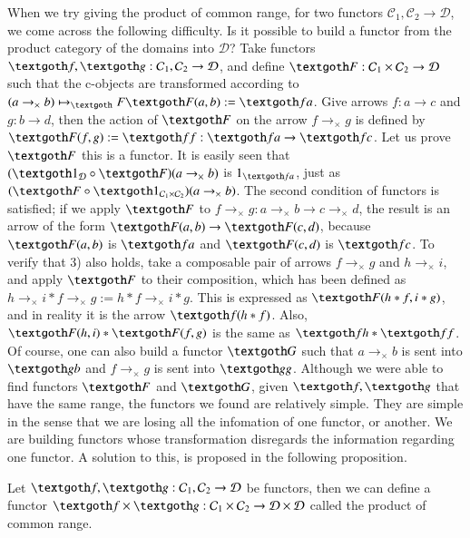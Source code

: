\documentclass [12pt]{book}
\begin{document}
When we try giving the product of common range, for two functors $\mathcal C_1,\mathcal C_2\rightarrow\mathcal D$, we come across the following difficulty. Is it possible to build a functor from the product category of the domains into $\mathcal D$? Take functors $\textgoth f,\textgoth g:\mathcal C_1,\mathcal C_2\rightarrow\mathcal D$, and define $\textgoth F:\mathcal C_1\times\mathcal C_2\rightarrow\mathcal D$ such that the c-objects are transformed according to $(a\rightarrow_\times b)\mapsto_\textgoth F\textgoth F(a,b):=\textgoth fa$. Give arrows $f:a\rightarrow c$ and $g:b\rightarrow d$, then the action of $\textgoth F$ on the arrow $f\rightarrow_\times g$ is defined by $\textgoth F(f,g):=\textgoth ff:\textgoth fa\rightarrow\textgoth fc$. Let us prove $\textgoth F$ this is a functor. It is easily seen that $(\textgoth1_\mathcal D\circ\textgoth F)(a\rightarrow_\times b)$ is $1_{\textgoth fa}$, just as $(\textgoth F\circ\textgoth1_{\mathcal C_1\times\mathcal C_2})(a\rightarrow_\times b)$. The second condition of functors is satisfied; if we apply $\textgoth F$ to $f\rightarrow_\times g:a\rightarrow_\times b\longrightarrow c\rightarrow_\times d$, the result is an arrow of the form $\textgoth F(a,b)\rightarrow\textgoth F(c,d)$, because $\textgoth F(a,b)$ is $\textgoth fa$ and $\textgoth F(c,d)$ is $\textgoth fc$. To verify that 3) also holds, take a composable pair of arrows $f\rightarrow_\times g$ and $h\rightarrow_\times i$, and apply $\textgoth F$ to their composition, which has been defined as $h\rightarrow_\times i*f\rightarrow_\times g:=h*f\rightarrow_\times i*g$. This is expressed as $\textgoth F(h*f,i*g)$, and in reality it is the arrow $\textgoth f(h*f)$. Also, $\textgoth F(h,i)*\textgoth F(f,g)$ is the same as $\textgoth fh*\textgoth ff$. Of course, one can also build a functor $\textgoth G$ such that $a\rightarrow_\times b$ is sent into $\textgoth gb$ and $f\rightarrow_\times g$ is sent into $\textgoth gg$. Although we were able to find functors $\textgoth F$ and $\textgoth G$, given $\textgoth f,\textgoth g$ that have the same range, the functors we found are relatively simple. They are simple in the sense that we are losing all the infomation of one functor, or another. We are building functors whose transformation disregards the information regarding one functor. A solution to this, is proposed in the following proposition.

\begin{proposition}Let $\textgoth f,\textgoth g:\mathcal C_1,\mathcal C_2\rightarrow\mathcal D$ be functors, then we can define a functor $\textgoth f\times\textgoth g:\mathcal C_1\times\mathcal C_2\rightarrow\mathcal D\times\mathcal D$ called the product of common range.\label{bif prop1}\end{proposition}
\end{document}

